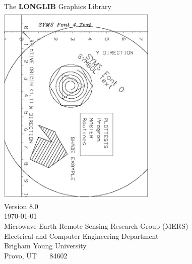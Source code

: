 \documentclass[11pt]{report}
\begin{document}
\vskip 3in
\begin{center}
{\Large The {\bf LONGLIB} Graphics Library}\\
\vskip 40pt
\includegraphics[width=3in,angle=90,origin=c]{figures/plottests0.jpg}\\
\vskip 40pt
{\large Version 8.0}\\
\today\\
\vskip40pt
Microwave Earth Remote Sensing Research Group (MERS)\\
Electrical and Computer Engineering Department \\
Brigham Young University\\
Provo, UT  \ \ \ 84602\\
\end{center}
\newpage
\tableofcontents
\end{document}
